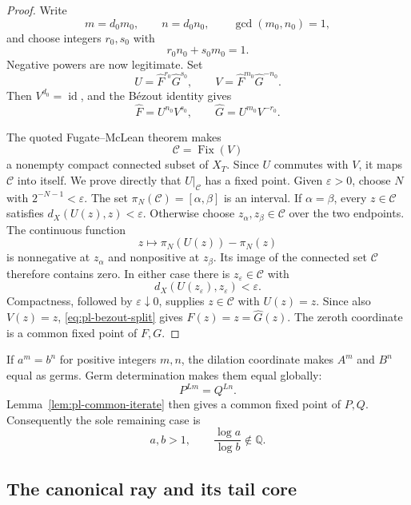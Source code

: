 \documentclass[11pt]{article}
\theoremstyle{definition}
\theoremstyle{remark}
\newcommand{\Fix}{\operatorname{Fix}}
\newcommand{\id}{\operatorname{id}}
\begin{document}
\begin{proof}
Write
\[
 m=d_0m_0,\qquad n=d_0n_0,\qquad \gcd(m_0,n_0)=1,
\]
and choose integers \(r_0,s_0\) with
\[
 r_0n_0+s_0m_0=1.
\]
Negative powers are now legitimate.  Set
\[
 U=\widehat F^{r_0}\widehat G^{s_0},\qquad
 V=\widehat F^{m_0}\widehat G^{-n_0}.
\]
Then \(V^{d_0}=\id\), and the B\'ezout identity gives
\begin{equation}\label{eq:pl-bezout-split}
 \widehat F=U^{n_0}V^{s_0},\qquad
 \widehat G=U^{m_0}V^{-r_0}.
\end{equation}

The quoted Fugate--McLean theorem makes
\[
 \mathcal C=\Fix(V)
\]
a nonempty compact connected subset of \(X_T\).  Since \(U\) commutes with
\(V\), it maps \(\mathcal C\) into itself.  We prove directly that
\(U|_{\mathcal C}\) has a fixed point.  Given \(\varepsilon>0\), choose
\(N\) with \(2^{-N-1}<\varepsilon\).  The set
\(\pi_N(\mathcal C)=[\alpha,\beta]\) is an interval.  If
\(\alpha=\beta\), every \(z\in\mathcal C\) satisfies
\(d_X(U(z),z)<\varepsilon\).  Otherwise choose
\(z_\alpha,z_\beta\in\mathcal C\) over the two endpoints.  The continuous
function
\[
 z\longmapsto\pi_N(U(z))-\pi_N(z)
\]
is nonnegative at \(z_\alpha\) and nonpositive at \(z_\beta\).  Its image of
the connected set \(\mathcal C\) therefore contains zero.  In either case
there is \(z_\varepsilon\in\mathcal C\) with
\[
 d_X(U(z_\varepsilon),z_\varepsilon)<\varepsilon.
\]
Compactness, followed by \(\varepsilon\downarrow0\), supplies
\(z\in\mathcal C\) with \(U(z)=z\).  Since also \(V(z)=z\),
\eqref{eq:pl-bezout-split} gives
\(\widehat F(z)=z=\widehat G(z)\).  The zeroth coordinate is a common fixed
point of \(F,G\).
\end{proof}

If \(a^m=b^n\) for positive integers \(m,n\), the dilation coordinate makes
\(A^m\) and \(B^n\) equal as germs.  Germ determination makes them equal
globally:
\[
 P^{Lm}=Q^{Ln}.
\]
 Lemma~\ref{lem:pl-common-iterate} then gives a common fixed point of
 \(P,Q\).
Consequently the sole remaining case is
\begin{equation}\label{eq:pl-independent-scales}
 a,b>1,\qquad \frac{\log a}{\log b}\notin\mathbb Q.
\end{equation}

\subsection{The canonical ray and its tail core}
\end{document}
